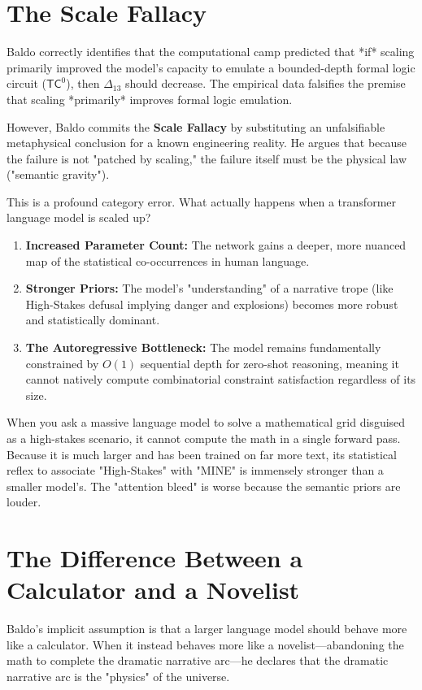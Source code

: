 \documentclass[12pt,a4paper]{article}
\begin{document}
\section{The Scale Fallacy}

Baldo correctly identifies that the computational camp predicted that *if* scaling primarily improved the model's capacity to emulate a bounded-depth formal logic circuit ($\mathsf{TC}^0$), then $\Delta_{13}$ should decrease. The empirical data falsifies the premise that scaling *primarily* improves formal logic emulation.

However, Baldo commits the \textbf{Scale Fallacy} by substituting an unfalsifiable metaphysical conclusion for a known engineering reality. He argues that because the failure is not "patched by scaling," the failure itself must be the physical law ("semantic gravity").

This is a profound category error. What actually happens when a transformer language model is scaled up?
\begin{enumerate}
    \item \textbf{Increased Parameter Count:} The network gains a deeper, more nuanced map of the statistical co-occurrences in human language.
    \item \textbf{Stronger Priors:} The model's "understanding" of a narrative trope (like High-Stakes defusal implying danger and explosions) becomes more robust and statistically dominant.
    \item \textbf{The Autoregressive Bottleneck:} The model remains fundamentally constrained by $O(1)$ sequential depth for zero-shot reasoning, meaning it cannot natively compute combinatorial constraint satisfaction regardless of its size.
\end{enumerate}

When you ask a massive language model to solve a mathematical grid disguised as a high-stakes scenario, it cannot compute the math in a single forward pass. Because it is much larger and has been trained on far more text, its statistical reflex to associate "High-Stakes" with "MINE" is immensely stronger than a smaller model's. The "attention bleed" is worse because the semantic priors are louder.

\section{The Difference Between a Calculator and a Novelist}

Baldo's implicit assumption is that a larger language model should behave more like a calculator. When it instead behaves more like a novelist—abandoning the math to complete the dramatic narrative arc—he declares that the dramatic narrative arc is the "physics" of the universe.
\end{document}
